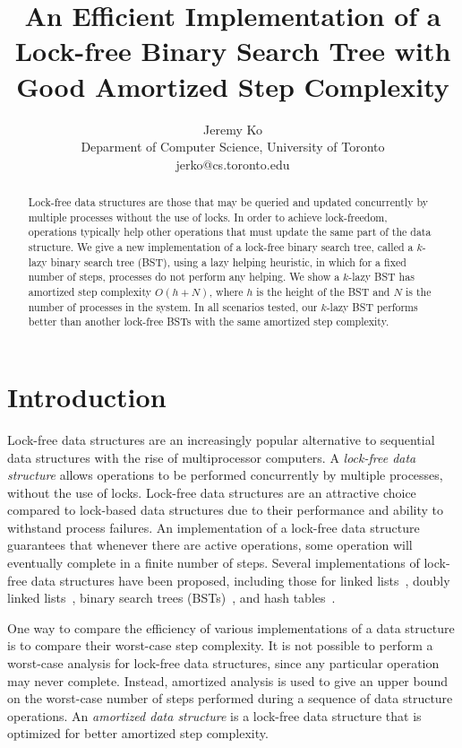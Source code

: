 \documentclass[letterpaper,twocolumn]{article}
\title{An Efficient Implementation of a Lock-free Binary Search Tree with Good Amortized Step Complexity}
\author{Jeremy Ko \\ Deparment of Computer Science, University of Toronto \\ jerko@cs.toronto.edu}
\date{}
\begin{document}
\maketitle


\begin{abstract}
Lock-free data structures are those that may be queried and updated concurrently by multiple processes without the use of locks. In order to achieve lock-freedom, operations typically help other operations that must update the same part of the data structure. We give a new implementation of a lock-free binary search tree, called a $k$-lazy binary search tree (BST), using a lazy helping heuristic, in which for a fixed number of steps, processes do not perform any helping. We show a $k$-lazy BST has amortized step complexity $O(h + N)$, where $h$ is the height of the BST and $N$ is the number of processes in the system. In all scenarios tested, our $k$-lazy BST performs better than another lock-free BSTs with the same amortized step complexity.
\end{abstract}


\section{Introduction}

Lock-free data structures are an increasingly popular alternative to sequential data structures with the rise of multiprocessor computers. A \textit{lock-free data structure} allows operations to be performed concurrently by multiple processes, without the use of locks. Lock-free data structures are an attractive choice compared to lock-based data structures due to their performance and ability to withstand process failures. An implementation of a lock-free data structure guarantees that whenever there are active operations, some operation will eventually complete in a finite number of steps. Several implementations of lock-free data structures have been proposed, including those for linked lists~\cite{Valois95, Harris01, FomitchevR04}, doubly linked lists~\cite{Shafiei15}, binary search trees (BSTs)~\cite{EllenFRB10, EllenFHR13, Ko18}, and hash tables~\cite{Michael02, ShalevS06, PurcellH05}.

One way to compare the efficiency of various implementations of a data structure is to compare their worst-case step complexity. It is not possible to perform a worst-case analysis for lock-free data structures, since any particular operation may never complete. Instead, amortized analysis is used to give an upper bound on the worst-case number of steps performed during a sequence of data structure operations. An \textit{amortized data structure} is a lock-free data structure that is optimized for better amortized step complexity.
\end{document}
